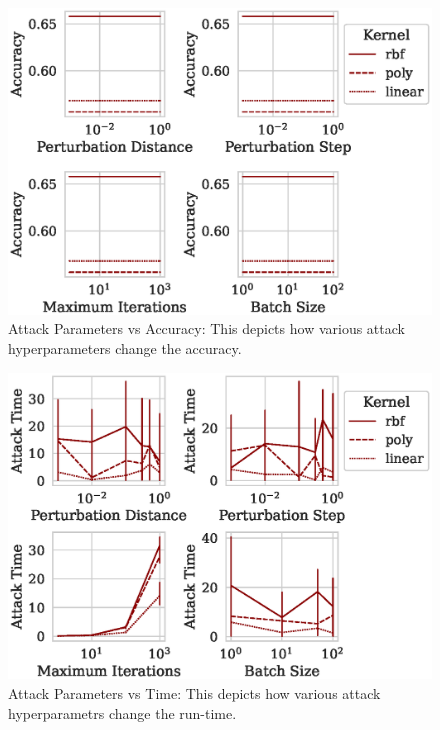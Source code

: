 \documentclass[fonts]{icst}
\begin{document}
\begin{figure}[!htb]
  \centering
  \includegraphics[width=.75\textwidth]{./generated/accuracy_vs_attack_parameters.eps}
   \caption{Attack Parameters vs Accuracy: This depicts how various attack hyperparameters change the accuracy.
   }
   \label{fig:attack_accuracy}
\end{figure}


\begin{figure}
    \centering
    \includegraphics[width=.75\textwidth]{./generated/train_time_vs_attack_parameters.eps}
    \caption{Attack Parameters vs Time: This depicts how various attack hyperparametrs change the run-time.}
    \label{fig:attack_time}
\end{figure}
\end{document}
